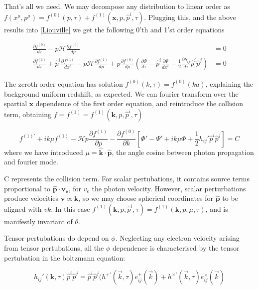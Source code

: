 \documentclass[a4paper,11pt]{article}
\renewcommand{\v}[1]{\mathbf{#1}}
\newcommand{\half}{\frac{1}{2}}
\newcommand{\unit}[1]{\hat{\v{#1}}}
\begin{document}
That's all we need. We may decompose any distribution to linear order as $f(x^\mu, p^\mu) = f^{(0)}(p,\tau) + f^{(1)}(\v{x},p,\hat{p}^i,\tau)$. Plugging this, and the above results into \ref{Liouville} we get the following 0'th and 1'st order equations

\begin{align}
\frac{\partial f^{(0)}}{d\tau} - p\mathcal{H}\frac{\partial f^{(0)}}{dp} &=0\\
\frac{\partial f^{(1)}}{d\tau} + \hat{p}^i\frac{\partial f^{(1)}}{dx^i} - p\mathcal{H}\frac{\partial f^{(1)}}{dp} +p\frac{\partial f^{(0)}}{dp}(\frac{\partial\Phi}{d\tau}-\hat{p}^i\frac{\partial \Psi}{dx^i}-\half \frac{\partial h_{ij}}{d\tau}\hat{p}^i\hat{p}^j) &=0
\end{align}

The zeroth order equation has solution $f^{(0)}(k,\tau) = f^{(0)}(ka)$, explaining the background uniform redshift, as expected. We can fourier transform over the spartial $\v{x}$ dependence of the first order equation, and reintroduce the collision term, obtaining $f = f^{(1)} = f^{(1)}(\v{k}, p, \hat{p}^i, \tau)$

\begin{equation}
f^{(1)'} + ik\mu f^{(1)}-\mathcal{H}p\frac{\partial f^{(1)}}{\partial p} - \frac{\partial f^{(0)}}{\partial k} [ \Phi ' - \Psi ' + ik\mu \Phi + \half h_{ij}'\hat{p}^i\hat{p}^j] = 
C
\end{equation}
where we have introduced $\mu = \unit{k} \cdot \unit{p}$, the angle cosine between photon propagation and fourier mode.

C represents the collision term. For scalar pertubations, it contains source terms proportional to $\unit{p}\cdot\v{v_e}$, for $v_e$ the photon velocity. However, scalar perturbations produce velocities $\v{v} \propto \v{k}$, so we may choose spherical coordinates for $\unit{p}$ to be aligned with $v{k}$. In this case  $f^{(1)}(\v{k}, p, \hat{p}^i, \tau) = f^{(1)}(\v{k}, p, \mu, \tau)$, and is manifestly invariant of $\theta$.

Tensor pertubations do depend on $\phi$. Neglecting any electron velocity arising from tensor pertubations, all the $\phi$ dependence is characterised by the tensor pertubation in the boltzmann equation:

\begin{equation}
h_{ij}'(\v{k},\tau)\hat{p}^i\hat{p}^j = \hat{p}^i\hat{p}^j (h^{+'}(\vec{k},\tau)e_{ij}^+(\vec{k}) + h^{\times'}(\vec{k},\tau)e_{ij}^\times(\vec{k})
\end{equation}
\end{document}

